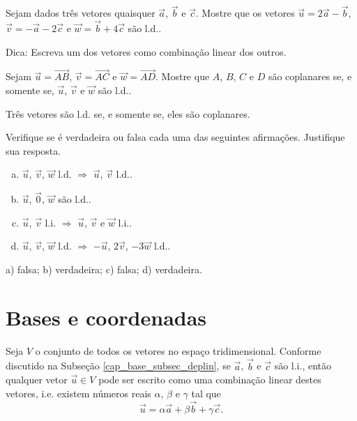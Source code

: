 \begin{exer}
  Sejam dados três vetores quaisquer $\vec{a}$, $\vec{b}$ e $\vec{c}$. Mostre que os vetores $\vec{u} = 2\vec{a}-\vec{b}$, $\vec{v}=-\vec{a}-2\vec{c}$ e $\vec{w}=\vec{b}+4\vec{c}$ são l.d..
\end{exer}
\begin{resp}
  Dica: Escreva um dos vetores como combinação linear dos outros.
\end{resp}

\begin{exer}
  Sejam $\vec{u} = \overrightarrow{AB}$, $\vec{v} = \overrightarrow{AC}$ e $\vec{w} = \overrightarrow{AD}$. Mostre que $A$, $B$, $C$ e $D$ são coplanares se, e somente se, $\vec{u}$, $\vec{v}$ e $\vec{w}$ são l.d..
\end{exer}
\begin{resp}
  Três vetores são l.d. se, e somente se, eles são coplanares.
\end{resp}

\begin{exer}
  Verifique se é verdadeira ou falsa cada uma das seguintes afirmações. Justifique sua resposta.
  \begin{enumerate}[a)]
  \item $\vec{u}$, $\vec{v}$, $\vec{w}$ l.d. $\Rightarrow$ $\vec{u}$, $\vec{v}$ l.d..
  \item $\vec{u}$, $\vec{0}$, $\vec{w}$ são l.d..
  \item $\vec{u}$, $\vec{v}$ l.i. $\Rightarrow$ $\vec{u}$, $\vec{v}$ e $\vec{w}$ l.i..
  \item $\vec{u}$, $\vec{v}$, $\vec{w}$ l.d. $\Rightarrow$ $-\vec{u}$, $2\vec{v}$, $-3\vec{w}$ l.d..
  \end{enumerate}
\end{exer}
\begin{resp}
  a) falsa; b) verdadeira; c) falsa; d) verdadeira.
\end{resp}

\section{Bases e coordenadas}\label{cap_base_sec_base}

Seja $V$ o conjunto de todos os vetores no espaço tridimensional. Conforme discutido na Subseção \ref{cap_base_subsec_deplin}, se $\vec{a}$, $\vec{b}$ e $\vec{c}$ são l.i., então qualquer vetor $\vec{u}\in V$ pode ser escrito como uma combinação linear destes vetores, i.e. existem números reais $\alpha$, $\beta$ e $\gamma$ tal que
\begin{equation}
  \vec{u} = \alpha\vec{a} + \beta\vec{b} + \gamma\vec{c}.
\end{equation}

